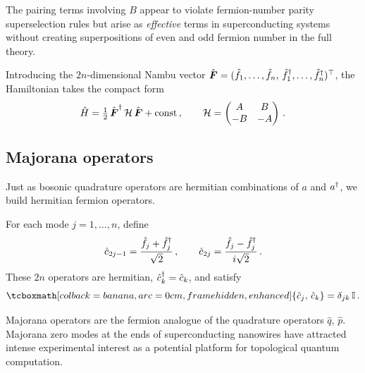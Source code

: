 \begin{remark}
  The pairing terms involving $B$ appear to violate fermion-number
  parity superselection rules but arise as \emph{effective} terms in
  superconducting systems without creating superpositions of even and
  odd fermion number in the full theory.
\end{remark}

Introducing the $2n$-dimensional Nambu vector
$\hat{\boldsymbol{F}} = (\hat{f}_1, \ldots, \hat{f}_n,\,
\hat{f}_1^\dagger, \ldots, \hat{f}_n^\dagger)^\top$,
the Hamiltonian takes the compact form
\begin{equation}\label{eq:fermion-H-compact}
  \hat{H}
  = \tfrac{1}{2}\,\hat{\boldsymbol{F}}^\dagger\, \mathcal{H}\,\hat{\boldsymbol{F}}
  + \text{const}\,,\qquad
  \mathcal{H}
  = \begin{pmatrix} A & B \\ -B & -A \end{pmatrix}\,.
\end{equation}

\subsection{Majorana operators}\label{sec:majorana}

Just as bosonic quadrature operators are hermitian combinations of $a$
and $a^\dagger$, we build hermitian fermion operators.

\begin{definition}\label{def:majorana}
  For each mode $j = 1, \ldots, n$, define
  \begin{equation}\label{eq:majorana-def}
    \hat{c}_{2j-1}
    = \frac{\hat{f}_j + \hat{f}_j^\dagger}{\sqrt{2}}\,,\qquad
    \hat{c}_{2j}
    = \frac{\hat{f}_j - \hat{f}_j^\dagger}{i\sqrt{2}}\,.
  \end{equation}
  These $2n$ operators are hermitian,
  $\hat{c}_k^\dagger = \hat{c}_k$, and satisfy
  \begin{equation}\label{eq:majorana-car}
    \eqbox{\{\hat{c}_j,\, \hat{c}_k\} = \delta_{jk}\,\One}\,.
  \end{equation}
\end{definition}

\begin{intuition}
  Majorana operators are the fermion analogue of the quadrature
  operators $\hat{q}$, $\hat{p}$.  Majorana zero modes at the ends of
  superconducting nanowires have attracted intense experimental
  interest as a potential platform for topological quantum computation.
\end{intuition}

